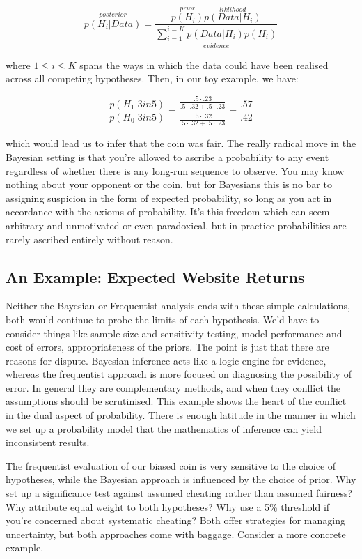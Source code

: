 \documentclass{tufte-handout}
\begin{document}
$$ \overset{posterior}{p(H_{i} | Data)} = \frac{\overset{prior}{p(H_{i})}\overset{liklihood}{p(Data | H_{i})}}{\underset{evidence}{\sum_{i=1}^{i =K} p(Data | H_{i})p(H_i)}}$$

where $ 1 \leq i \leq K$ spans the ways in which the data could have been realised across all competing hypotheses. Then, in our toy example, we have:

$$ \frac{p(H_1 | 3 in 5)}{p(H_{0} | 3 in 5)} = \frac{\frac{.5\cdot .23}{.5\cdot .32 + .5 \cdot .23}}{\frac{.5\cdot .32}{.5\cdot .32 + .5 \cdot .23}} = \frac{.57}{.42} $$

\noindent which would lead us to infer that the coin was fair. The really radical move in the Bayesian setting is that you're allowed to ascribe a probability to any event regardless of whether there is any long-run sequence to observe. You may know nothing about your opponent or the coin, but for Bayesians this is no bar to assigning suspicion in the form of expected probability, so long as you act in accordance with the axioms of probability. It's this freedom which can seem arbitrary and unmotivated or even paradoxical, but in practice probabilities  are rarely ascribed entirely without reason. 


\subsection{An Example: Expected Website Returns}
Neither the Bayesian or Frequentist analysis ends with these simple calculations, both would continue to probe the limits of each hypothesis. We'd have to consider things like sample size and sensitivity testing, model performance and cost of errors, appropriateness of the priors. The point is just that there are reasons for dispute. Bayesian inference acts like a logic engine for evidence, whereas the frequentist approach is more focused on diagnosing the possibility of error. In general they are complementary methods, and when they conflict the assumptions should be scrutinised.  This example shows the heart of the conflict in the dual aspect of probability. There is enough latitude in the manner in which we set up a probability model that the mathematics of inference can yield inconsistent results.\linebreak

\noindent  The frequentist evaluation of our biased coin is very sensitive to the choice of hypotheses, while the Bayesian approach is influenced by the choice of prior. Why set up a significance test against assumed cheating rather than assumed fairness? Why attribute equal weight to both hypotheses? Why use a 5\% threshold if you're concerned about systematic cheating? Both offer strategies for managing uncertainty, but both approaches come with baggage. Consider a more concrete example.
\linebreak
\end{document}
